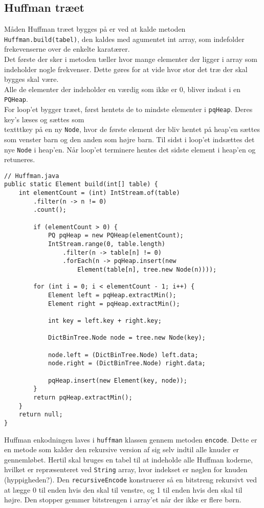 \documentclass{article}
\begin{document}
\subsection*{Huffman træet}
Måden Huffman træet bygges på er ved at kalde metoden \texttt{Huffman.build(tabel)}, den kaldes med agumentet int array, som indefolder frekevenserne over de enkelte karatærer.\\
Det første der sker i metoden tæller hvor mange elementer der ligger i array som indeholder nogle frekvenser. Dette gøres for at vide hvor stor det træ der skal bygges skal være.\\
Alle de elementer der indeholder en værdig som ikke er 0, bliver indsat i en \texttt{PQHeap}.\\
For loop'et bygger træet, først hentets de to mindste elementer i \texttt{pqHeap}. Deres key's læses og sættes som \\texttt{key} på en ny \texttt{Node}, hvor de første element der bliv hentet på heap'en sættes som venster barn og den anden som højre barn. Til sidst i loop'et indsættes det nye \texttt{Node} i heap'en. Når loop'et terminere hentes det sidste element i heap'en og retuneres.
\begin{lstlisting}
// Huffman.java
public static Element build(int[] table) {
	int elementCount = (int) IntStream.of(table)
		.filter(n -> n != 0)
		.count();
		
        if (elementCount > 0) {
			PQ pqHeap = new PQHeap(elementCount);
			IntStream.range(0, table.length)
				.filter(n -> table[n] != 0)
				.forEach(n -> pqHeap.insert(new
					Element(table[n], tree.new Node(n))));
					
		for (int i = 0; i < elementCount - 1; i++) {
			Element left = pqHeap.extractMin();
			Element right = pqHeap.extractMin();
			
			int key = left.key + right.key;

			DictBinTree.Node node = tree.new Node(key);
			
			node.left = (DictBinTree.Node) left.data;
			node.right = (DictBinTree.Node) right.data;
            
			pqHeap.insert(new Element(key, node));
		}
		return pqHeap.extractMin();
	}
	return null;
}
\end{lstlisting}
Huffman enkodningen laves i \texttt{huffman} klassen gennem metoden \texttt{encode}. Dette er en metode som kalder den rekursive version af sig selv indtil alle knuder er gennemløbet. Hertil skal bruges en tabel til at indeholde alle Huffman koderne, hvilket er repræsenteret ved \texttt{String} array, hvor indekset er nøglen for knuden (hyppigheden?). Den \texttt{recursiveEncode} konstruerer så en bitstreng rekursivt ved at lægge 0 til enden hvis den skal til venstre, og 1 til enden hvis den skal til højre. Den stopper gemmer bitstrengen i array'et når der ikke er flere børn.
\end{document}
